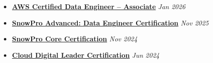 \begin{itemize}[leftmargin=0.5cm, label={}, itemsep=2pt]
    \item \href{https://www.credly.com/badges/9584ca00-6b1f-4b1e-aafa-648d0db4da69/public_url}{\textbf{AWS Certified Data Engineer – Associate}} \hfill \textit{Jan 2026}
    \item \href{https://achieve.snowflake.com/ed6ca1a6-a2ec-4a29-bf95-5a8760d5faaf#acc.PLlXZK8I}{\textbf{SnowPro Advanced: Data Engineer Certification}} \hfill \textit{Nov 2025}
    \item \href{https://achieve.snowflake.com/b61b59e1-2fb5-4a67-82fd-c24633e4264c#acc.2Cb5AjBe}{\textbf{SnowPro Core Certification}} \hfill \textit{Nov 2024}
    \item \href{https://www.credly.com/badges/65efbb39-a0fb-4a8d-ad7b-d08de5ac7d89/public_url}{\textbf{Cloud Digital Leader Certification}} \hfill \textit{Jun 2024}
\end{itemize}
    